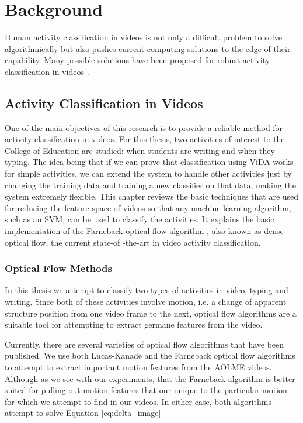 \chapter{Background}
Human activity classification in videos is not only a difficult problem to solve
algorithmically but also pushes current computing solutions to the edge of
their capability. Many possible solutions have been proposed for robust activity
classification in videos \cite{niebles2010modeling} \cite{bashir2007object}
\cite{ribeiro2005human} \cite{karpathy2014large}.

\section{\label{section:activity_classification}Activity Classification in Videos}
One of the main objectives of this research is to provide a reliable method for
activity classification in videos. For this thesis, two activities of interest
to the College of Education are studied: when students are writing and when they
typing. The idea being that if we can prove that classification using ViDA works
for simple activities, we can extend the system to handle other activities just
by changing the training data and training a new classifier on that data, making
the system extremely flexible. This chapter reviews the basic techniques that
are used for reducing the feature space of videos so that any machine learning
algorithm, such as an SVM, can be used to classify the activities. It explains
the basic implementation of the Farneback optical flow algorithm
\cite{farneback2003two}, also known as dense optical flow, the current state-of
-the-art in video activity classification,

\subsection{\label{section:optical_flow_methods}Optical Flow Methods}
In this thesis we attempt to classify two types of activities in video,  typing
and writing. Since both of these activities involve motion, i.e. a change of
apparent structure position from one video frame to the next, optical flow
algorithms  are a suitable tool for attempting to extract germane features from
the video.

Currently, there are several varieties of optical flow algorithms that have been
published. We use both Lucas-Kanade \cite{lucas1981iterative} and the Farneback
\cite{farneback2003two}  optical flow algorithms to attempt to extract
important motion features from the AOLME videos. Although as we see with our
experiments, that the Farneback algorithm is better suited for pulling out
motion features that our unique to the particular motion for which we attempt
to find in our videos. In either case, both algorithms attempt to solve
Equation \ref{eq:delta_image}


